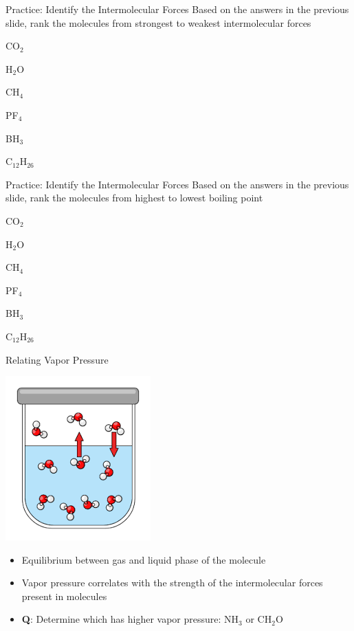 \documentclass[11pt]{beamer}
\begin{document}
\begin{frame}{Practice: Identify the Intermolecular Forces}
  Based on the answers in the previous slide, rank the molecules
  from strongest to weakest intermolecular forces
  
  CO$_2$

  H$_2$O

  CH$_4$

  PF$_4$

  BH$_3$

  C$_{12}$H$_{26}$
\end{frame}

\begin{frame}{Practice: Identify the Intermolecular Forces}
  Based on the answers in the previous slide, rank the molecules
  from highest to lowest boiling point
  
  CO$_2$

  H$_2$O

  CH$_4$

  PF$_4$

  BH$_3$

  C$_{12}$H$_{26}$
\end{frame}

\begin{frame}{Relating Vapor Pressure}
  \begin{center}
    \includegraphics[width=0.3\linewidth]{vapor_pressure}
  \end{center}
  \begin{itemize}
  \item Equilibrium between gas and liquid phase of the molecule
  \item Vapor pressure correlates with the strength of the
    intermolecular forces present in molecules
  \item \textbf{Q}: Determine which has higher vapor pressure:
    NH$_3$ or CH$_2$O
  \end{itemize}
\end{frame}
\end{document}
